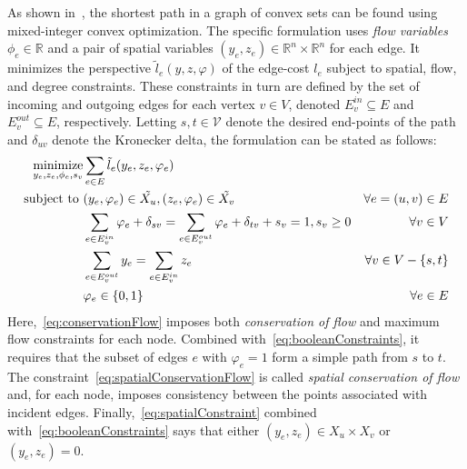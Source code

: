 \documentclass[letterpaper, 11pt]{article}
\begin{document}
As shown in~\cite{}, the shortest path in a graph of convex sets can be found using mixed-integer convex optimization.
The specific formulation uses \emph{flow variables} $\phi_e \in \mathbb{R}$ and a pair of spatial
variables $(y_e, z_e) \in \mathbb{R}^n \times \mathbb{R}^n$ for each edge.
It minimizes the perspective $\tilde l_e(y, z, \varphi)$ of the edge-cost $l_e$
subject to spatial, flow, and degree constraints.
These constraints in turn are defined by the set of incoming and outgoing edges for each vertex $v \in V$,
denoted $E^{in}_v \subseteq E$ and $E^{out}_v \subseteq E$, respectively.
Letting $s, t \in \mathcal{V}$ denote the desired end-points of the path and $\delta_{uv}$
denote the Kronecker delta, the formulation can be stated as follows:
\begin{subequations}\label{eq:shortest_path}
  \begin{align}
  \operatorname*{minimize}_{y_e, z_e, \phi_e, s_v} &\sum_{e\in E}\tilde l_e(y_e, z_e, \varphi_e) \nonumber \\
  \mbox{subject to }  
  & (y_e, \varphi_e) \in \tilde{ X_u},    (z_e, \varphi_e) \in \tilde{ X_v}  &\forall  e=(u, v) \in E \label{eq:spatialConstraint}\\
  & \sum_{e \in E^{in}_v} \varphi_e + \delta_{sv} = \sum_{e \in E^{out}_v} \varphi_e + \delta_{tv} + s_v = 1, s_v \ge 0 &\forall v \in V  \label{eq:conservationFlow}\\
  & \sum_{e \in E^{out}_v} y_e = \sum_{e \in E^{in}_v} z_e &\forall v \in V - \{s, t\}   \label{eq:spatialConservationFlow}\\ 
  & \varphi_e \in \{0, 1\}  & \forall  e \in E  \label{eq:booleanConstraints}
  \end{align}
\end{subequations}
Here,~\eqref{eq:conservationFlow}  imposes both \emph{conservation of flow} and
maximum flow constraints for each node. Combined with~\eqref{eq:booleanConstraints},
it requires that the subset of edges $e$ with $\varphi_e = 1$ form a simple path from $s$ to $t$.
The constraint~\eqref{eq:spatialConservationFlow}
is called \emph{spatial conservation of flow} and, for each node, imposes consistency between
the points associated with incident  edges. Finally,~\eqref{eq:spatialConstraint} combined with~\eqref{eq:booleanConstraints}
says that either $(y_e, z_e) \in X_u \times X_v$  or $(y_e, z_e) = 0$.
\end{document}
